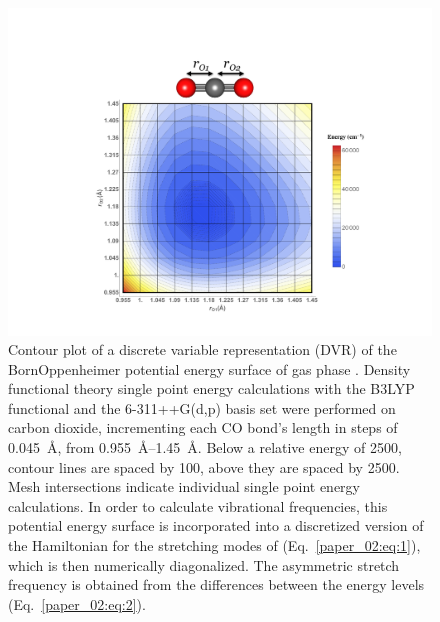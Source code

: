 \begin{figure}
  \centering
  \includegraphics[width=\textwidth]{paper_02/Fig1.pdf}
  \caption[DVR contour plot]{Contour plot of a discrete variable representation (DVR) of the Born\textendash{}Oppenheimer potential energy surface of gas phase . Density functional theory single point energy calculations with the B3LYP functional and the 6-311++G(d,p) basis set were performed on carbon dioxide, incrementing each CO bond's length in steps of \SI{0.045}{\angstrom}, from \SIrange{0.955}{1.45}{\angstrom}. Below a relative energy of \SI{2500}{\wavenumber}, contour lines are spaced by \SI{100}{\wavenumber}, above they are spaced by \SI{2500}{\wavenumber}. Mesh intersections indicate individual single point energy calculations. In order to calculate vibrational frequencies, this potential energy surface is incorporated into a discretized version of the Hamiltonian for the stretching modes of  (Eq.~\ref{paper_02:eq:1}), which is then numerically diagonalized. The asymmetric stretch frequency is obtained from the differences between the energy levels (Eq.~\ref{paper_02:eq:2}).}
  \label{paper_02:fig:1}
\end{figure}

